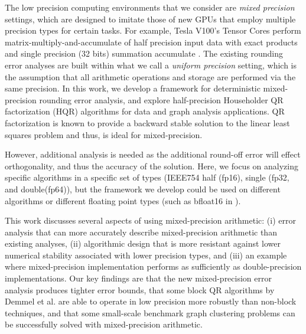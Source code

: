 The low precision computing environments that we consider are \emph{mixed precision} settings, which are designed to imitate those of new GPUs that employ multiple precision types for certain tasks. 
For example, Tesla V100's Tensor Cores perform matrix-multiply-and-accumulate of half precision input data with exact products and single precision (32 bits) summation accumulate \cite{nvdia}.
The existing rounding error analyses are built within what we call a \emph{uniform precision} setting, which is the assumption that all arithmetic operations and storage are performed via the same precision.
In this work, we develop a framework for deterministic mixed-precision rounding error analysis, and explore half-precision Householder QR factorization (HQR) algorithms for data and graph analysis applications. 
QR factorization is known to provide a backward stable solution to the linear least squares problem and thus, is ideal for mixed-precision. 

However, additional analysis is needed as the additional round-off error will effect orthogonality, and thus the accuracy of the solution. 
Here, we focus on analyzing specific algorithms in a specific set of types (IEEE754 half (fp16), single (fp32, and double(fp64)), but the framework we develop 
could be used on different algorithms or different floating point types (such as bfloat16 in \cite{tagliavini2018floating}).\par

This work discusses several aspects of using mixed-precision arithmetic: (i) error analysis that can more accurately describe mixed-precision arithmetic than existing analyses, (ii) algorithmic design that is more resistant against lower numerical stability associated with lower precision types, and (iii) an example where mixed-precision implementation performs as sufficiently as double-precision implementations. 
Our key findings are that the new mixed-precision error analysis produces tighter error bounds, that some block QR algorithms by Demmel et al. \cite{Demmel2012} are able to operate in low precision more robustly than non-block techniques, and that some small-scale benchmark graph clustering problems can be successfully solved with mixed-precision arithmetic.

